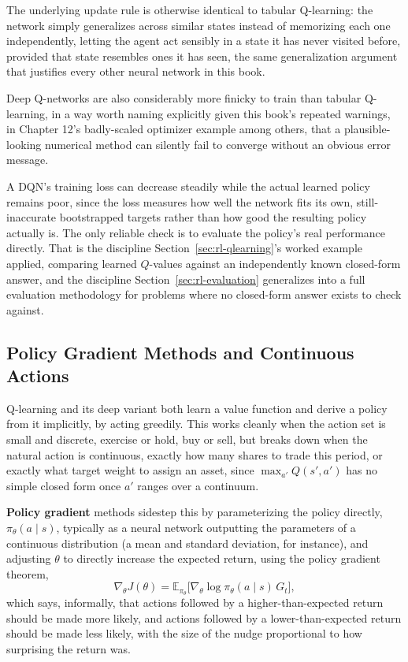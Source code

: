 \documentclass[../ai_in_finance]{subfiles}
\begin{document}
The underlying update rule is otherwise identical to tabular Q-learning: the network simply generalizes across similar states instead of memorizing each one independently, letting the agent act sensibly in a state it has never visited before, provided that state resembles ones it has seen, the same generalization argument that justifies every other neural network in this book.

Deep Q-networks are also considerably more finicky to train than tabular Q-learning, in a way worth naming explicitly given this book's repeated warnings, in Chapter 12's badly-scaled optimizer example among others, that a plausible-looking numerical method can silently fail to converge without an obvious error message.

A DQN's training loss can decrease steadily while the actual learned policy remains poor, since the loss measures how well the network fits its own, still-inaccurate bootstrapped targets rather than how good the resulting policy actually is. The only reliable check is to evaluate the policy's real performance directly. That is the discipline Section~\ref{sec:rl-qlearning}'s worked example applied, comparing learned $Q$-values against an independently known closed-form answer, and the discipline Section~\ref{sec:rl-evaluation} generalizes into a full evaluation methodology for problems where no closed-form answer exists to check against.

\subsection{Policy Gradient Methods and Continuous Actions}
\label{sec:policy-gradient}

Q-learning and its deep variant both learn a value function and derive a policy from it implicitly, by acting greedily. This works cleanly when the action set is small and discrete, exercise or hold, buy or sell, but breaks down when the natural action is continuous, exactly how many shares to trade this period, or exactly what target weight to assign an asset, since $\max_{a'} Q(s',a')$ has no simple closed form once $a'$ ranges over a continuum.

\textbf{Policy gradient} methods sidestep this by parameterizing the policy directly, $\pi_\theta(a \mid s)$, typically as a neural network outputting the parameters of a continuous distribution (a mean and standard deviation, for instance), and adjusting $\theta$ to directly increase the expected return, using the policy gradient theorem,
\begin{equation*}
\nabla_\theta J(\theta) = \mathbb{E}_{\pi_\theta}\Big[\nabla_\theta \log \pi_\theta(a \mid s) \, G_t\Big],
\end{equation*}
which says, informally, that actions followed by a higher-than-expected return should be made more likely, and actions followed by a lower-than-expected return should be made less likely, with the size of the nudge proportional to how surprising the return was.
\end{document}

